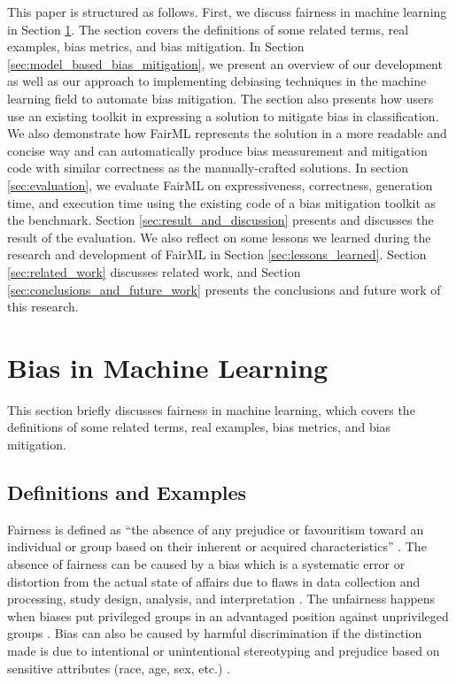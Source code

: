 \documentclass[sigconf,review]{acmart}
\begin{document}
	This paper is structured as follows. First, we discuss fairness in machine learning in Section \ref{sec:bias_in_machine_learning}. The section covers the definitions of some related terms, real examples, bias metrics, and bias mitigation. In Section \ref{sec:model_based_bias_mitigation}, we present an overview of our development as well as our approach to implementing debiasing techniques in the machine learning field to automate bias mitigation. 
	The section also presents how users use an existing toolkit in expressing a solution to mitigate bias in classification. We also demonstrate how FairML represents the solution in a more readable and concise way and can automatically produce bias measurement and mitigation code with similar correctness as the manually-crafted solutions.
	In section \ref{sec:evaluation}, we evaluate FairML on expressiveness, correctness, generation time, and execution time using the existing code of a bias mitigation toolkit as the benchmark. Section \ref{sec:result_and_discussion} presents and discusses the result of the evaluation. 
	We also reflect on some lessons we learned during the research and development of FairML in Section \ref{sec:lessons_learned}. 
	Section \ref{sec:related_work} discusses related work, and Section \ref{sec:conclusions_and_future_work} presents the conclusions and future work of this research.
	
	\section{Bias in Machine Learning}
	\label{sec:bias_in_machine_learning}
	This section briefly discusses fairness in machine learning, which covers the definitions of some related terms, real examples, bias metrics, and bias mitigation.
	
	\subsection{Definitions and Examples}
	\label{sec:definitions_and_examples}
	
	Fairness is defined as ``the absence of any prejudice or favouritism toward an individual or
	group based on their inherent or acquired characteristics'' \cite{mehrabi2021survey}.
	The absence of fairness can be caused by a bias which is a systematic error or distortion from the actual state of affairs due to flaws in data collection and processing, study design, analysis, and interpretation \cite{oxford2022bias}. 
	The unfairness happens when biases put privileged groups in an advantaged position against unprivileged groups \cite{bellamy2018ai}. 
	Bias can also be caused by harmful discrimination if the distinction made is due to intentional or unintentional stereotyping and prejudice based on sensitive attributes (race, age, sex, etc.) \cite{mehrabi2021survey,chen2019fairness}. 
	
\end{document}
